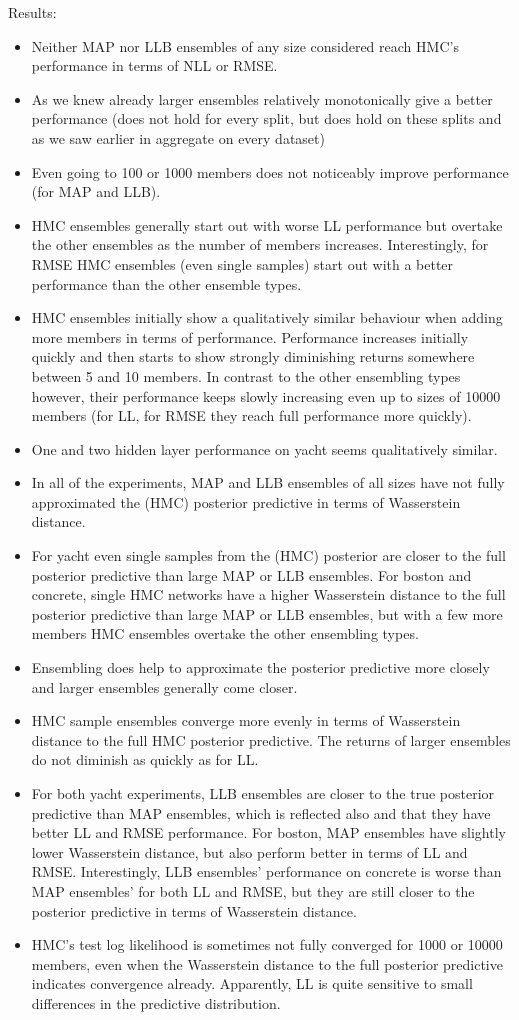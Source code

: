 \documentclass[../thesis.tex]{subfiles}
\begin{document}
Results:
\begin{itemize}
    \item Neither MAP nor LLB ensembles of any size considered reach HMC's performance in terms of NLL or RMSE.
    \item As we knew already larger ensembles relatively monotonically give a better performance (does not hold for every split, but does hold on these splits and as we saw earlier in aggregate on every dataset)
    \item Even going to 100 or 1000 members does not noticeably improve performance (for MAP and LLB).
    \item HMC ensembles generally start out with worse LL performance but overtake the other ensembles as the number of members increases. Interestingly, for RMSE HMC ensembles (even single samples) start out with a better performance than the other ensemble types.
    \item HMC ensembles initially show a qualitatively similar behaviour when adding more members in terms of performance. Performance increases initially quickly and then starts to show strongly diminishing returns somewhere between 5 and 10 members. In contrast to the other ensembling types however, their performance keeps slowly increasing even up to sizes of 10000 members (for LL, for RMSE they reach full performance more quickly).
    \item One and two hidden layer performance on yacht seems qualitatively similar.
    \item In all of the experiments, MAP and LLB ensembles of all sizes have not fully approximated the (HMC) posterior predictive in terms of Wasserstein distance.
    \item For yacht even single samples from the (HMC) posterior are closer to the full posterior predictive than large MAP or LLB ensembles. For boston and concrete, single HMC networks have a higher Wasserstein distance to the full posterior predictive than large MAP or LLB ensembles, but with a few more members HMC ensembles overtake the other ensembling types.
    \item Ensembling does help to approximate the posterior predictive more closely and larger ensembles generally come closer.
    \item HMC sample ensembles converge more evenly in terms of Wasserstein distance to the full HMC posterior predictive. The returns of larger ensembles do not diminish as quickly as for LL.
    \item For both yacht experiments, LLB ensembles are closer to the true posterior predictive than MAP ensembles, which is reflected also and that they have better LL and RMSE performance. For boston, MAP ensembles have slightly lower Wasserstein distance, but also perform better in terms of LL and RMSE. Interestingly, LLB ensembles' performance on concrete is worse than MAP ensembles' for both LL and RMSE, but they are still closer to the posterior predictive in terms of Wasserstein distance.
    \item HMC's test log likelihood is sometimes not fully converged for 1000 or 10000 members, even when the Wasserstein distance to the full posterior predictive indicates convergence already. Apparently, LL is quite sensitive to small differences in the predictive distribution.
\end{itemize}
\end{document}
